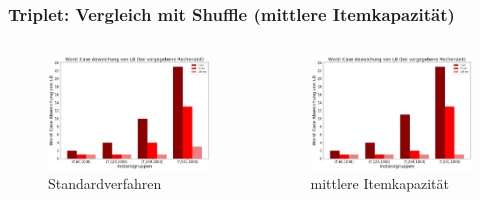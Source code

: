 \documentclass{beamer}
\begin{document}
\begin{frame}
\frametitle{Triplet: Vergleich mit Shuffle (mittlere Itemkapazität)}


\begin{columns}[c] %

\begin{figure}[!htbp]
\includegraphics[scale=0.2]{img/wc_trip.png}
\caption{Standardverfahren}
\label{fig:architecture}
\end{figure}


\begin{figure}[!htbp]
\includegraphics[scale=0.2]{img/shuffleWC.png}
\caption{mittlere Itemkapazität}
\label{fig:architecture}
\end{figure}


\end{columns}
\end{frame}
\end{document}
